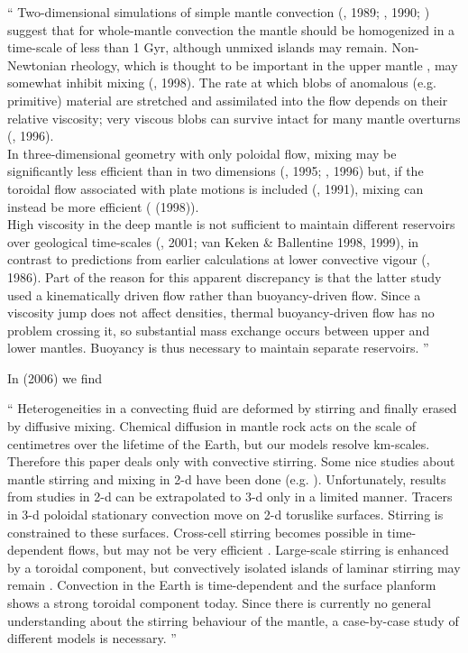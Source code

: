 \begin{displayquote}
{\color{darkgray}
``
Two-dimensional simulations of simple mantle convection (\textcite{chri89}, 1989; 
\textcite{ketu90}, 1990; \textcite{scha94}) suggest that for whole-mantle 
convection the mantle should be homogenized in a time-scale of less than 1 Gyr, although
unmixed islands may remain. Non-Newtonian rheology, which is thought to be 
important in the upper mantle \cite{kawu93}, may somewhat inhibit mixing (\textcite{tepy98}, 1998). 
The rate at which blobs of anomalous (e.g. primitive) material are stretched
and assimilated into the ﬂow depends on their relative viscosity; very viscous blobs
can survive intact for many mantle overturns (\textcite{mang96}, 1996).
\\
In three-dimensional geometry with only poloidal ﬂow, mixing may be signiﬁcantly
less efficient than in two dimensions (\textcite{schh95}, 1995; \textcite{schh96}, 1996) 
but, if the toroidal ﬂow associated with plate motions is 
included (\textcite{gaot91}, 1991), mixing can instead be more efficient 
(\textcite{feri98} (1998)).
\\
High viscosity in the deep mantle is not suﬃcient to maintain diﬀerent reservoirs
over geological time-scales (\textcite{feri01}, 2001; van Keken \& Ballentine 1998,
1999), in contrast to predictions from earlier calculations at lower convective vigour
(\textcite{guda86b}, 1986). Part of the reason for this apparent discrepancy is that
the latter study used a kinematically driven ﬂow rather than buoyancy-driven ﬂow.
Since a viscosity jump does not affect densities, thermal buoyancy-driven ﬂow has no
problem crossing it, so substantial mass exchange occurs between upper and lower
mantles. Buoyancy is thus necessary to maintain separate reservoirs.
''
}
\end{displayquote}


In \textcite{gowh06} (2006) we find
\begin{displayquote}
{\color{darkgray}
``
Heterogeneities in a convecting ﬂuid are deformed by
stirring and ﬁnally erased by diffusive mixing. Chemical diﬀusion in mantle rock
acts on the scale of centimetres over the lifetime of the Earth, but our models
resolve km-scales. Therefore this paper deals only with convective stirring. Some
nice studies about mantle stirring and mixing in 2-d have been done (e.g. 
\cite{chri89,guda86b,kest91,ketu90,mebo95,olyb84,olyb84b,teyl96,teyp97,tepy98}).
Unfortunately, results from studies in 2-d can be extrapolated to 3-d only in a limited
manner. Tracers in 3-d poloidal stationary convection move on 2-d toruslike
surfaces. Stirring is constrained to these surfaces. Cross-cell stirring becomes possible
in time-dependent ﬂows, but may not be very efficient \cite{schh96}. Large-scale stirring is
enhanced by a toroidal component, but convectively isolated islands of laminar
stirring may remain \cite{feri98}. Convection in the Earth is time-dependent and the surface
planform shows a strong toroidal component today. Since there is currently no
general understanding about the stirring behaviour of the mantle, a case-by-case
study of different models is necessary.
''
}
\end{displayquote}



